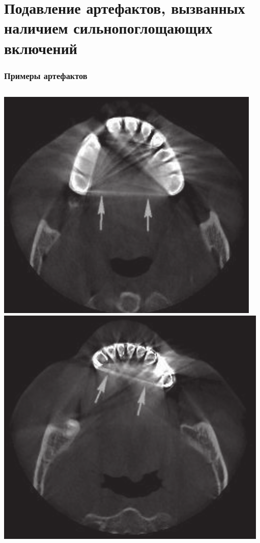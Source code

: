 \documentclass[12pt]{beamer}
\begin{document}
\section{Подавление артефактов, вызванных наличием сильнопоглощающих включений}

\begin{frame}
\frametitle{Примеры артефактов}

\begin{columns}[t]
\centering
\includegraphics[height=0.5\textheight]{../Dissertation/images/part2_img/tooth_artifacts_med}\\
\includegraphics[height=0.5\textheight]{../Dissertation/images/part2_img/tooth_artifacts_med_2}


\end{columns}
\end{frame}
\end{document}
